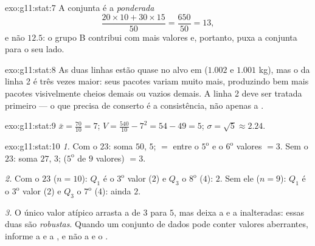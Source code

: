\begin{solution}{exo:g11:stat:7}
A  conjunta é a  \emph{ponderada}
\[
\frac{20 \times 10 + 30 \times 15}{50} = \frac{650}{50} = 13,
\]
e não $12.5$: o grupo B contribui com mais valores e, portanto, puxa a
 conjunta para o seu lado.
\end{solution}

\begin{solution}{exo:g11:stat:8}
As duas linhas estão quase no alvo em  ($1.002$ e $1.001$ kg), mas o
 da linha 2 é três vezes maior: seus pacotes variam muito
mais, produzindo bem mais pacotes visivelmente cheios demais ou vazios
demais. A linha 2 deve ser tratada primeiro --- o que precisa de conserto
é a consistência, não apenas a .
\end{solution}

\begin{solution}{exo:g11:stat:9}
$\bar x = \frac{70}{10} = 7$;
$V = \frac{540}{10} - 7^2 = 54 - 49 = 5$;
$\sigma = \sqrt5 \approx 2.24$.
\end{solution}

\begin{solution}{exo:g11:stat:10}
\emph{1.} Com o $23$: soma $50$,  $5$;  $=$  entre
o $5^{\text{o}}$ e o $6^{\text{o}}$ valores $= 3$. Sem o $23$: soma $27$,
 $3$;  ($5^{\text{o}}$ de $9$ valores) $= 3$.

\emph{2.} Com o $23$ ($n = 10$): $Q_1$ é o $3^{\text{o}}$ valor ($2$) e
$Q_3$ o $8^{\text{o}}$ ($4$):  $2$. Sem ele
($n = 9$): $Q_1$ é o $3^{\text{o}}$ valor ($2$) e $Q_3$ o $7^{\text{o}}$
($4$): ainda $2$.

\emph{3.} O único valor atípico arrasta a  de $3$ para $5$, mas
deixa a  e a  inalteradas: essas duas são
\emph{robustas}. Quando um conjunto de dados pode conter valores
aberrantes, informe a  e a , e não a  e
o .
\end{solution}

